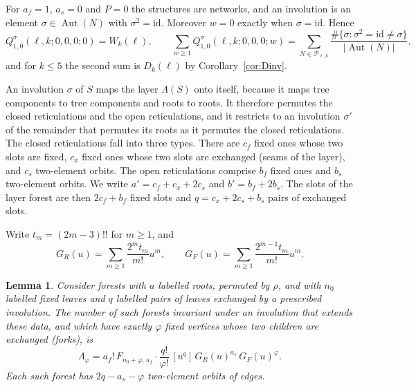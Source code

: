 \documentclass[11pt,a4paper]{article}
\newtheorem{lemma}[theorem]{Lemma}
\theoremstyle{definition}
\newcommand{\Aut}{\operatorname{Aut}}
\newcommand{\cP}{\mathcal{P}}
\begin{document}
For $a_f=1$, $a_s=0$ and $P=0$ the structures are networks, and an involution is an element $\sigma\in\Aut(N)$ with $\sigma^2=\mathrm{id}$. Moreover $w=0$ exactly when $\sigma=\mathrm{id}$. Hence
\begin{equation}\label{eq:QsigmaTop}
Q^\sigma_{1,0}(\ell,k;0,0,0;0)=W_k(\ell),\qquad
\sum_{w\ge1}Q^\sigma_{1,0}(\ell,k;0,0,0;w)=\sum_{N\in\cP_{\ell,k}}\frac{\#\{\sigma:\sigma^2=\mathrm{id}\ne\sigma\}}{|\Aut(N)|},
\end{equation}
and for $k\le5$ the second sum is $D_k(\ell)$ by Corollary~\ref{cor:Dinv}.

An involution $\sigma$ of $S$ maps the layer $\Lambda(S)$ onto itself, because it maps tree components to tree components and roots to roots. It therefore permutes the closed reticulations and the open reticulations, and it restricts to an involution $\sigma'$ of the remainder that permutes its roots as it permutes the closed reticulations. The closed reticulations fall into three types. There are $c_f$ fixed ones whose two slots are fixed, $c_x$ fixed ones whose two slots are exchanged (seams of the layer), and $c_s$ two-element orbits. The open reticulations comprise $b_f$ fixed ones and $b_s$ two-element orbits. We write $a'=c_f+c_x+2c_s$ and $b'=b_f+2b_s$. The slots of the layer forest are then $2c_f+b_f$ fixed slots and $q=c_x+2c_s+b_s$ pairs of exchanged slots.

Write $t_m=(2m-3)!!$ for $m\ge1$, and
\[
G_R(u)=\sum_{m\ge1}\frac{2^m t_m}{m!}u^m,\qquad G_F(u)=\sum_{m\ge1}\frac{2^{m-1}t_m}{m!}u^m .
\]

\begin{lemma}\label{lem:invforest}
Consider forests with $a$ labelled roots, permuted by $\rho$, and with $n_0$ labelled fixed leaves and $q$ labelled pairs of leaves exchanged by a prescribed involution. The number of such forests invariant under an involution that extends these data, and which have exactly $\varphi$ fixed vertices whose two children are exchanged (forks), is
\begin{equation}\label{eq:invforest}
\Lambda_\varphi=a_f!\,F_{n_0+\varphi,\,a_f}\cdot\frac{q!}{\varphi!}\,[u^q]\,G_R(u)^{a_s}\,G_F(u)^{\varphi}.
\end{equation}
Each such forest has $2q-a_s-\varphi$ two-element orbits of edges.
\end{lemma}
\end{document}
